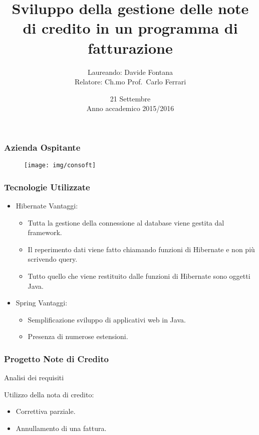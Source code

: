 \documentclass[]{beamer}
\title[Note di credito]{Sviluppo della gestione delle note di credito in un
programma di fatturazione}
\author[Davide Fontana]{Laureando: Davide Fontana \\Relatore: Ch.mo Prof.\ Carlo Ferrari }
\date[21/09/2016]{21 Settembre \\ Anno accademico 2015/2016}
\institute[DEI Unipd]{Corso di Laurea in Ingegneria Informatica\\ Department of Information Engineering}
\begin{document}
    \frame{\titlepage}

    \begin{frame}
        \frametitle{Azienda Ospitante}
        \begin{figure}[H]
            \centering
            \texttt{[image: img/consoft]}\label{logo:consoft}
        \end{figure}
    \end{frame}

    \begin{frame}
        \frametitle{Tecnologie Utilizzate}
        \begin{itemize}
            \item Hibernate
                \newline
                Vantaggi:
                \begin{itemize}
                    \item Tutta la gestione della connessione al database viene 
                        gestita dal framework.
                    \item Il reperimento dati viene fatto chiamando funzioni di 
                        Hibernate e non più scrivendo query. 
                    \item Tutto quello che viene restituito dalle funzioni di 
                        Hibernate sono oggetti Java.
                \end{itemize}
            \item Spring
                \newline
                Vantaggi:
                \begin{itemize}
                    \item Semplificazione sviluppo di applicativi web in Java.
                    \item Presenza di numerose estensioni.
                \end{itemize}
        \end{itemize}
    \end{frame}

    \begin{frame}
        \frametitle{Progetto Note di Credito}
        \begin{LARGE}
            Analisi dei requisiti 
        \end{LARGE}
        \newline
        \newline
        Utilizzo della nota di credito:
        \begin{itemize}
            \item Correttiva parziale.
            \item Annullamento di una fattura.
        \end{itemize}
    \end{frame}
\end{document}
